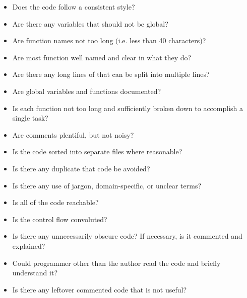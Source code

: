 \documentclass[12pt, titlepage]{article}
\begin{document}
\begin{itemize}
  \item{Does the code follow a consistent style?}
  \item{Are there any variables that should not be global?}
  \item{Are function names not too long (i.e. less than 40 characters)?}
  \item{Are most function well named and clear in what they do?}
  \item{Are there any long lines of that can be split into multiple lines?}
  \item{Are global variables and functions documented?}
  \item{Is each function not too long and sufficiently broken down to accomplish a single task?}
  \item{Are comments plentiful, but not noisy?}
  \item{Is the code sorted into separate files where reasonable?}
  \item{Is there any duplicate that code be avoided?}
  \item{Is there any use of jargon, domain-specific, or unclear terms?}
  \item{Is all of the code reachable?}
  \item{Is the control flow convoluted?}
  \item{Is there any unnecessarily obscure code? If necessary, is it commented and explained?}
  \item{Could programmer other than the author read the code and briefly understand it?}
  \item{Is there any leftover commented code that is not useful?}
\end{itemize}
\end{document}
